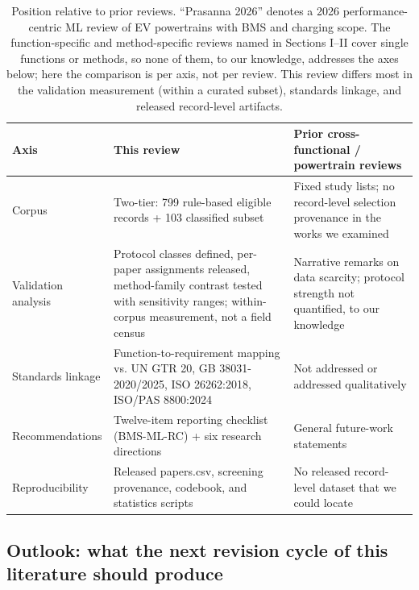 \documentclass[journal]{IEEEtran}
\begin{document}
\begin{table}[!t]
\caption{Position relative to prior reviews. ``Prasanna 2026'' denotes a 2026 performance-centric ML review of EV powertrains with BMS and charging scope. The function-specific and method-specific reviews named in Sections I--II cover single functions or methods, so none of them, to our knowledge, addresses the axes below; here the comparison is per axis, not per review. This review differs most in the validation measurement (within a curated subset), standards linkage, and released record-level artifacts.}
\label{tab:TABLE_POSITION}
\centering
\footnotesize
\begin{tabular}{|p{0.70in}|p{2.97in}|p{2.97in}|}
\hline
\textbf{Axis} & \textbf{This review} & \textbf{Prior cross-functional / powertrain reviews} \\
\hline
Corpus & Two-tier: 799 rule-based eligible records + 103 classified subset & Fixed study lists; no record-level selection provenance in the works we examined \\
Validation analysis & Protocol classes defined, per-paper assignments released, method-family contrast tested with sensitivity ranges; within-corpus measurement, not a field census & Narrative remarks on data scarcity; protocol strength not quantified, to our knowledge \\
Standards linkage & Function-to-requirement mapping vs. UN GTR 20, GB 38031-2020/2025, ISO 26262:2018, ISO/PAS 8800:2024 & Not addressed or addressed qualitatively \\
Recommendations & Twelve-item reporting checklist (BMS-ML-RC) + six research directions & General future-work statements \\
Reproducibility & Released papers.csv, screening provenance, codebook, and statistics scripts & No released record-level dataset that we could locate \\
\hline
\end{tabular}
\end{table}

\subsection{Outlook: what the next revision cycle of this literature should produce}
\end{document}
